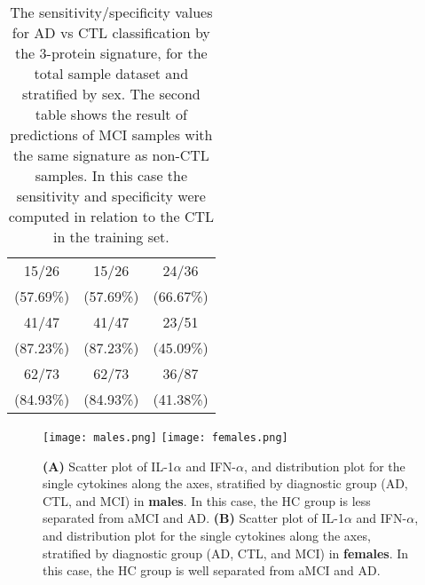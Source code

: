 \documentclass{standalone}
\begin{document}
\begin{table}[!htb]
\begin{minipage}{.5\linewidth}
\begin{tabular}{ccc}
          \hline
                           15/26            &   15/26                &   24/36               \\
                                 (57.69\%)  &         (57.69\%)      &         (66.67\%)     \\
                           41/47            &   41/47                &   23/51               \\
                                 (87.23\%)  &         (87.23\%)      &         (45.09\%)     \\
                           62/73            &   62/73                &   36/87               \\
                                 (84.93\%)  &         (84.93\%)      &         (41.38\%)     \\
          \hline
      \end{tabular}
  \end{minipage}
  \caption{The sensitivity/specificity values for AD vs CTL classification by the 3-protein signature, for the total sample dataset and stratified by sex.
    The second table shows the result of predictions of MCI samples with the same signature as non-CTL samples.
    In this case the sensitivity and specificity were computed in relation to the CTL in the training set.
  }
  \label{tab:cytokine}
\end{table}


\begin{figure}[htbp]
\hspace{-1.0cm}
\texttt{[image: males.png]}
\qquad\qquad
\hspace{1.0cm}
\texttt{[image: females.png]}
\caption{\textbf{(A)} Scatter plot of IL-1$\alpha$ and IFN-$\alpha$, and distribution plot for the single cytokines along the axes, stratified by diagnostic group (AD, CTL, and MCI) in \textbf{males}.
In this case, the HC group is less separated from aMCI and AD.
\textbf{(B)} Scatter plot of IL-1$\alpha$ and IFN-$\alpha$, and distribution plot for the single cytokines along the axes, stratified by diagnostic group (AD, CTL, and MCI) in \textbf{females}.
In this case, the HC group is well separated from aMCI and AD.
}
\label{fig:cytokine_sex}
\end{figure}
\end{document}
